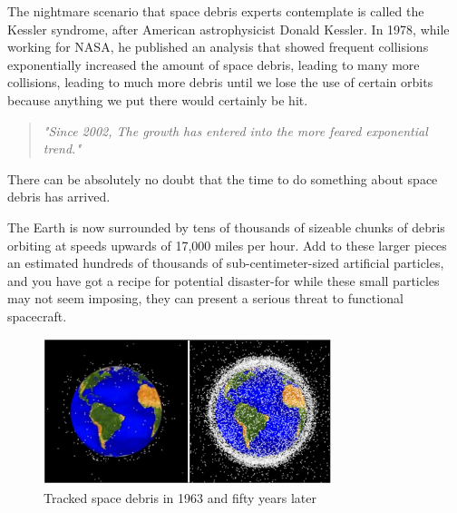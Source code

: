 The nightmare scenario that space debris experts contemplate is called the Kessler syndrome, after American astrophysicist Donald Kessler. In 1978, while working for NASA, he published an analysis\cite{kessler1978collision} that showed frequent collisions exponentially increased the amount of space debris, leading to many more collisions, leading to much more debris until we lose the use of certain orbits because anything we put there would certainly be hit.

\begin{quote}
\em{"Since 2002, The growth has entered into the more feared exponential trend."}
\end{quote}
There can be absolutely no doubt that the time to do something about space debris has arrived.

The Earth is now surrounded by tens of thousands of sizeable chunks of debris orbiting at speeds upwards of 17,000 miles per hour. Add to these larger pieces an estimated hundreds of thousands of sub-centimeter-sized artificial particles, and you have got a recipe for potential disaster-for while these small particles may not seem imposing, they can present a serious threat to functional spacecraft.

\begin{figure}[ht]
\centering
\includegraphics[width=0.75\textwidth]{fig/motivation/TrackedSpaceDebris}
\caption{Tracked space debris in 1963 and fifty years later}
\label{moti-TrackedSpaceDebris}
\end{figure}



\newpage

